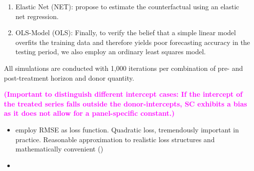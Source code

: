 \begin{itemize}
\begin{enumerate}
		\item Elastic Net (NET): \cite{doudchenko:2016} propose to estimate the counterfactual using an elastic net regression. 
		\item OLS-Model (OLS): Finally, to verify the belief that a simple linear model overfits the training data and therefore yields poor forecasting accuracy in the testing period, we also employ an ordinary least squares model.
	\end{enumerate}
\end{itemize}

All simulations are conducted with 1,000 iterations per combination of pre- and post-treatment horizon and donor quantity. 

\textcolor{magenta}{\textbf{(Important to distinguish different intercept cases: If the intercept of the treated series falls outside the donor-intercepts, SC exhibits a bias as it does not allow for a panel-specific constant.)}} 

\begin{itemize}
	\item employ RMSE as loss function. Quadratic loss, tremendously important in practice. Reasonable approximation to realistic loss structures and mathematically convenient (\cite{diebold:2017})
	\item 
\end{itemize}

